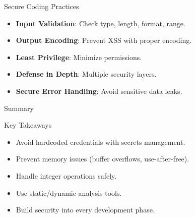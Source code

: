 \documentclass[12pt]{beamer}
\begin{document}
\begin{frame}{Secure Coding Practices}
  \begin{itemize}
    \item \textbf{Input Validation}: Check type, length, format, range.
    \item \textbf{Output Encoding}: Prevent XSS with proper encoding.
    \item \textbf{Least Privilege}: Minimize permissions.
    \item \textbf{Defense in Depth}: Multiple security layers.
    \item \textbf{Secure Error Handling}: Avoid sensitive data leaks.
  \end{itemize}
\end{frame}

\begin{frame}{Summary}
  \begin{block}{Key Takeaways}
    \begin{itemize}
      \item Avoid hardcoded credentials with secrets management.
      \item Prevent memory issues (buffer overflows, use-after-free).
      \item Handle integer operations safely.
      \item Use static/dynamic analysis tools.
      \item Build security into every development phase.
    \end{itemize}
  \end{block}
\end{frame}
\end{document}
